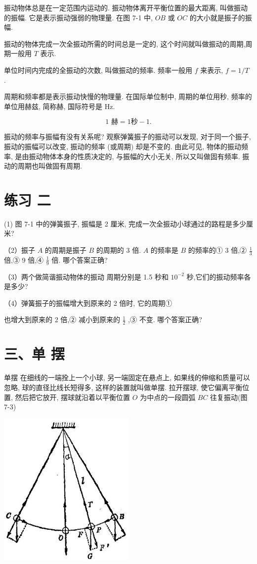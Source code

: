 \documentclass[10pt]{article}
\begin{document}
振动物体总是在一定范围内运动的. 振动物体离开平衡位置的最大距离, 叫做振动的振幅. 它是表示振动强弱的物理量. 在图 7-1 中, \({OB}\) 或 \({OC}\) 的大小就是振子的振幅.

振动的物体完成一次全振动所需的时间总是一定的, 这个时间就叫做振动的周期,周期一般用 \(T\) 表示.

单位时间内完成的全振动的次数, 叫做振动的频率. 频率一般用 \(f\) 来表示, \(f = 1/T\) .

周期和频率都是表示振动快慢的物理量. 在国际单位制中, 周期的单位用秒, 频率的单位用赫兹, 简称赫, 国际符号是 Hz.

\[
\text{1 赫} = 1\text{秒} - 1\text{.}
\]

振动的频率与振幅有没有关系呢? 观察弹簧振子的振动可以发现, 对于同一个振子, 振动的振幅可以改变, 振动的频率 (或周期) 却是不变的. 由此可见, 物体的振动频率, 是由振动物体本身的性质决定的, 与振幅的大小无关, 所以又叫做固有频率. 振动的周期也叫做固有周期.

\section*{练习 二}

(1) 图 7-1 中的弹簧振子, 振幅是 2 厘米, 完成一次全振动小球通过的路程是多少厘米?

（2）振子 \(A\) 的周期是振子 \(B\) 的周期的 3 倍. \(A\) 的频率是 \(B\) 的频率的① 3 倍,② \(\frac{1}{3}\) 倍,③ 9 倍,④ \(\frac{1}{9}\) 倍. 哪个答案正确?

（3）两个做简谐振动物体的振动 周期分别是 1.5 秒和 \({10}^{-2}\) 秒,它们的振动频率各是多少?

（4）弹簧振子的振幅增大到原来的 2 倍时, 它的周期①

也增大到原来的 2 倍,② 减小到原来的 \(\frac{1}{2}\) ,③ 不变. 哪个答案正确?

\section*{三、单 摆}

单摆 在细线的一端拴上一个小球, 另一端固定在悬点上, 如果线的伸缩和质量可以忽略, 球的直径比线长短得多, 这样的装置就叫做单摆. 拉开摆球, 使它偏离平衡位置, 然后把它放开, 摆球就沿着以平衡位置 \(O\) 为中点的一段圆弧 \({BC}\) 往复振动(图 7-3)

\begin{center}
\includegraphics[max width=0.5\textwidth]{images/01912d55-147c-70aa-b0e0-1782a122f948_196_160788.jpg}
\end{center}
\end{document}
